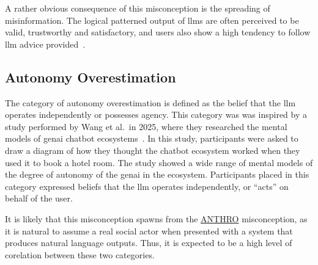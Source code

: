 A rather obvious consequence of this misconception is the spreading of misinformation. The logical patterned output of \gls{llms} are often perceived to be valid, trustworthy and satisfactory, and users also show a high tendency to follow \gls{llm} advice provided\ \cite{shekar_people_2025}.

\subsection{Autonomy Overestimation}\label{overauto}
The category of autonomy overestimation is defined as the belief that the \gls{llm} operates independently or possesses agency. This category was was inspired by a study performed by Wang et al.\ in 2025, where they researched the mental models of \gls{genai} chatbot ecosystems\ \cite{wang_mental_2025}. In this study, participants were  asked to draw a diagram of how they thought the chatbot ecosystem worked when they used it to book a hotel room. The study showed a wide range of mental models of the degree of autonomy of the \gls{genai} in the ecosystem. Participants placed in this category expressed beliefs that the \gls{llm} operates independently, or ``acts'' on behalf of the user.

It is likely that this misconception spawns from the \hyperref[anthro]{ANTHRO} misconception, as it is natural to assume a real social actor when presented with a system that produces natural language outputs\cite{reinecke_double-edged_2025,jose_digital_2025}. Thus, it is expected to be a high level of corelation between these two categories.


